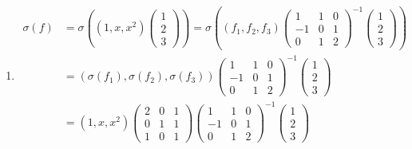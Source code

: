 \begin{exercise}
\begin{exgroup}
\begin{answer}
\begin{enumerate}
                \item \begin{align*}
                          \sigma(f) & = \sigma\left((1, x, x^2)
                          \begin{pmatrix} 1 \\ 2 \\ 3 \end{pmatrix}\right)= \sigma\left((f_1, f_2, f_3)
                          \begin{pmatrix}
                              1  & 1 & 0 \\
                              -1 & 0 & 1 \\
                              0  & 1 & 2
                          \end{pmatrix}^{-1} \begin{pmatrix} 1 \\ 2 \\ 3 \end{pmatrix}\right) \\
                                    & = (\sigma(f_1), \sigma(f_2), \sigma(f_3))
                          \begin{pmatrix}
                              1  & 1 & 0 \\
                              -1 & 0 & 1 \\
                              0  & 1 & 2
                          \end{pmatrix}^{-1} \begin{pmatrix} 1 \\ 2 \\ 3 \end{pmatrix}        \\
                                    & = (1, x, x^2)
                          \begin{pmatrix}
                              2 & 0 & 1 \\
                              0 & 1 & 1 \\
                              1 & 0 & 1
                          \end{pmatrix}
                          \begin{pmatrix}
                              1  & 1 & 0 \\
                              -1 & 0 & 1 \\
                              0  & 1 & 2
                          \end{pmatrix}^{-1}
                          \begin{pmatrix} 1 \\ 2 \\ 3 \end{pmatrix}                           \\

\end{align*}
\end{enumerate}
\end{answer}
\end{exgroup}
\end{exercise}
